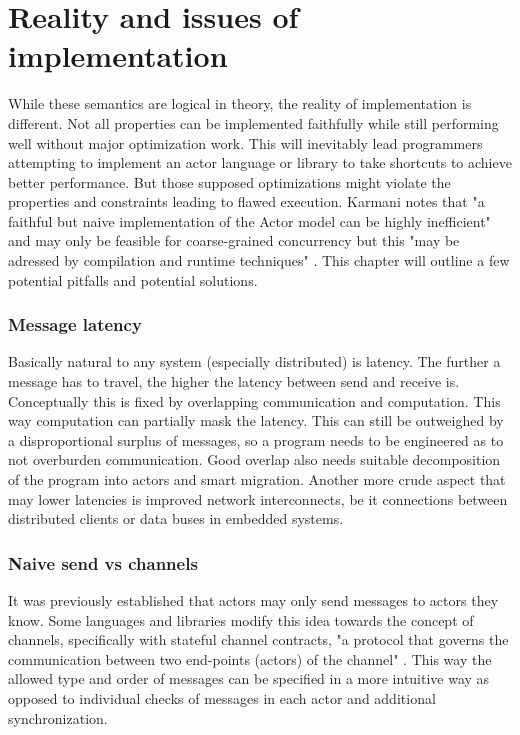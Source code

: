 \documentclass[A4]{article}
\begin{document}
\section{Reality and issues of implementation}
While these semantics are logical in theory, the reality of implementation is different. Not all properties can be implemented faithfully while still performing well without major optimization work. This will inevitably lead programmers attempting to implement an actor language or library to take shortcuts to achieve better performance. But those supposed optimizations might violate the properties and constraints leading to flawed execution. Karmani notes that "a faithful but naive implementation of the Actor model can be highly inefficient" \cite[p.~8]{reference/parallel/KarmaniA11} and may only be feasible for coarse-grained concurrency \cite[p.~7]{conf/pppj/KarmaniSA09} but this "may be adressed by compilation and runtime techniques" \cite[p.~8]{reference/parallel/KarmaniA11}. This chapter will outline a few potential pitfalls and potential solutions.
\subsubsection{Message latency}
Basically natural to any system (especially distributed) is latency. The further a message has to travel, the higher the latency between send and receive is. 
Conceptually this is fixed by overlapping communication and computation. This way computation can partially mask the latency. This can still be outweighed by a disproportional surplus of messages, so a program needs to be engineered as to not overburden communication. Good overlap also needs suitable decomposition of the program into actors and smart migration. \cite[p.~8]{reference/parallel/KarmaniA11}
Another more crude aspect that may lower latencies is improved network interconnects, be it connections between distributed clients or data buses in embedded systems. 
\subsubsection{Naive send vs channels}
It was previously established that actors may only send messages to actors they know. Some languages and libraries modify this idea towards the concept of channels, specifically with stateful channel contracts, "a protocol that governs the communication between two end-points (actors) of the channel" \cite[p.~8]{reference/parallel/KarmaniA11}. This way the allowed type and order of messages can be specified in a more intuitive way as opposed to individual checks of messages in each actor and additional synchronization. \cite[p.~8]{reference/parallel/KarmaniA11}
\end{document}
